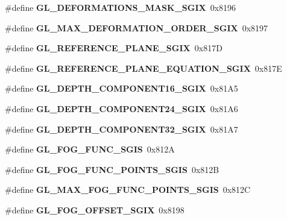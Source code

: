 \begin{DoxyCompactItemize}
\item 
\#define {\bfseries G\+L\+\_\+\+D\+E\+F\+O\+R\+M\+A\+T\+I\+O\+N\+S\+\_\+\+M\+A\+S\+K\+\_\+\+S\+G\+I\+X}~0x8196\label{_s_d_l__opengl_8h_a1eb7448de38a38a3e8b53f38e54001e3}

\item 
\#define {\bfseries G\+L\+\_\+\+M\+A\+X\+\_\+\+D\+E\+F\+O\+R\+M\+A\+T\+I\+O\+N\+\_\+\+O\+R\+D\+E\+R\+\_\+\+S\+G\+I\+X}~0x8197\label{_s_d_l__opengl_8h_ade5ec06703f2743f4b6161a32f6ee0f6}

\item 
\#define {\bfseries G\+L\+\_\+\+R\+E\+F\+E\+R\+E\+N\+C\+E\+\_\+\+P\+L\+A\+N\+E\+\_\+\+S\+G\+I\+X}~0x817\+D\label{_s_d_l__opengl_8h_a8d5107e36252eed548405743b58b9d2f}

\item 
\#define {\bfseries G\+L\+\_\+\+R\+E\+F\+E\+R\+E\+N\+C\+E\+\_\+\+P\+L\+A\+N\+E\+\_\+\+E\+Q\+U\+A\+T\+I\+O\+N\+\_\+\+S\+G\+I\+X}~0x817\+E\label{_s_d_l__opengl_8h_a1c169657d62b7195accca1e9199d906c}

\item 
\#define {\bfseries G\+L\+\_\+\+D\+E\+P\+T\+H\+\_\+\+C\+O\+M\+P\+O\+N\+E\+N\+T16\+\_\+\+S\+G\+I\+X}~0x81\+A5\label{_s_d_l__opengl_8h_a6d917ddf4600cbe3bd800858dd3e87c7}

\item 
\#define {\bfseries G\+L\+\_\+\+D\+E\+P\+T\+H\+\_\+\+C\+O\+M\+P\+O\+N\+E\+N\+T24\+\_\+\+S\+G\+I\+X}~0x81\+A6\label{_s_d_l__opengl_8h_aff3bebdc355c913cdd81238ed698bd0e}

\item 
\#define {\bfseries G\+L\+\_\+\+D\+E\+P\+T\+H\+\_\+\+C\+O\+M\+P\+O\+N\+E\+N\+T32\+\_\+\+S\+G\+I\+X}~0x81\+A7\label{_s_d_l__opengl_8h_a957d381f2202d8c7b1f31b7a057058d0}

\item 
\#define {\bfseries G\+L\+\_\+\+F\+O\+G\+\_\+\+F\+U\+N\+C\+\_\+\+S\+G\+I\+S}~0x812\+A\label{_s_d_l__opengl_8h_ac1eddc280cee434e9f2dbc34e2434b79}

\item 
\#define {\bfseries G\+L\+\_\+\+F\+O\+G\+\_\+\+F\+U\+N\+C\+\_\+\+P\+O\+I\+N\+T\+S\+\_\+\+S\+G\+I\+S}~0x812\+B\label{_s_d_l__opengl_8h_a1de41cbd1e5dede6b9a8ea858adb78d6}

\item 
\#define {\bfseries G\+L\+\_\+\+M\+A\+X\+\_\+\+F\+O\+G\+\_\+\+F\+U\+N\+C\+\_\+\+P\+O\+I\+N\+T\+S\+\_\+\+S\+G\+I\+S}~0x812\+C\label{_s_d_l__opengl_8h_a21a9c04b548039de1302baaf47bb56c1}

\item 
\#define {\bfseries G\+L\+\_\+\+F\+O\+G\+\_\+\+O\+F\+F\+S\+E\+T\+\_\+\+S\+G\+I\+X}~0x8198\label{_s_d_l__opengl_8h_a98b5908055b0a28f17b84a9c0193aef5}


\end{DoxyCompactItemize}
